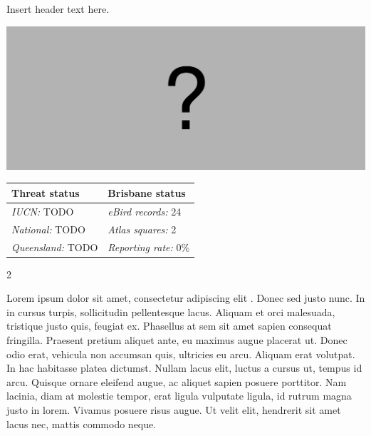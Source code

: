 \documentclass[12pt,openany,oneside]{book}
\let\origfigure\figure
\let\endorigfigure\endfigure
\renewenvironment{figure}[1][2] {
  \expandafter\origfigure\expandafter[H]
} {
  \endorigfigure
}
\let\Begin\begin
\let\End\end
\theoremstyle{definition}
\theoremstyle{definition}
\theoremstyle{definition}
\theoremstyle{remark}
\begin{document}

Insert header text here.

\begin{figure}
\centering
\includegraphics[width=\textwidth,keepaspectratio=true]{assets/misc/missing-profile.png}
\caption{Insert caption here.}
\end{figure}

\begin{tabu} to 
\toprule
Threat status & Brisbane status\\
\midrule
\textit{IUCN:} TODO & \textit{eBird records:} 24\\
\textit{National:} TODO & \textit{Atlas squares:} 2\\
\textit{Queensland:} TODO & \textit{Reporting rate:} 0\%\\
\bottomrule
\end{tabu} 
\vspace{0.15cm}

\Begin{multicols}{2}

Lorem ipsum dolor sit amet, consectetur adipiscing elit
\citep{rexample1, rexample2, rexample3}. Donec sed justo nunc. In in
cursus turpis, sollicitudin pellentesque lacus. Aliquam et orci
malesuada, tristique justo quis, feugiat ex. Phasellus at sem sit amet
sapien consequat fringilla. Praesent pretium aliquet ante, eu maximus
augue placerat ut. Donec odio erat, vehicula non accumsan quis,
ultricies eu arcu. Aliquam erat volutpat. In hac habitasse platea
dictumst. Nullam lacus elit, luctus a cursus ut, tempus id arcu. Quisque
ornare eleifend augue, ac aliquet sapien posuere porttitor. Nam lacinia,
diam at molestie tempor, erat ligula vulputate ligula, id rutrum magna
justo in lorem. Vivamus posuere risus augue. Ut velit elit, hendrerit
sit amet lacus nec, mattis commodo neque.

\End{multicols}

\clearpage

\clearpage
\end{document}
